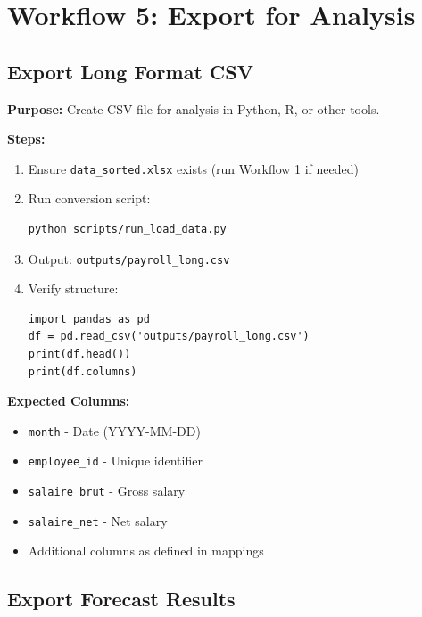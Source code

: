 \section{Workflow 5: Export for Analysis}

\subsection{Export Long Format CSV}

\textbf{Purpose:} Create CSV file for analysis in Python, R, or other tools.

\textbf{Steps:}

\begin{enumerate}
    \item Ensure \texttt{data\_sorted.xlsx} exists (run Workflow 1 if needed)
    \item Run conversion script:
    \begin{lstlisting}
python scripts/run_load_data.py
    \end{lstlisting}
    
    \item Output: \texttt{outputs/payroll\_long.csv}
    
    \item Verify structure:
    \begin{lstlisting}[style=pythonstyle]
import pandas as pd
df = pd.read_csv('outputs/payroll_long.csv')
print(df.head())
print(df.columns)
    \end{lstlisting}
\end{enumerate}

\textbf{Expected Columns:}
\begin{itemize}
    \item \texttt{month} - Date (YYYY-MM-DD)
    \item \texttt{employee\_id} - Unique identifier
    \item \texttt{salaire\_brut} - Gross salary
    \item \texttt{salaire\_net} - Net salary
    \item Additional columns as defined in mappings
\end{itemize}

\subsection{Export Forecast Results}

